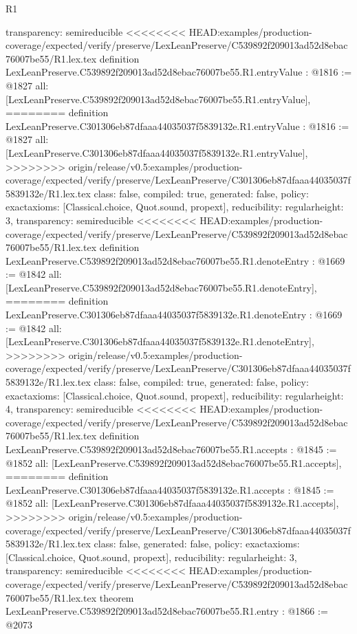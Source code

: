 \begin{lexlean}{R1}
\begin{coremodule}
{{{{{{{{{{{{{{{  transparency: semireducible
}
<<<<<<<< HEAD:examples/production-coverage/expected/verify/preserve/LexLeanPreserve/C539892f209013ad52d8ebac76007be55/R1.lex.tex
definition LexLeanPreserve.C539892f209013ad52d8ebac76007be55.R1.entryValue : @1816 := @1827 {
  all: [LexLeanPreserve.C539892f209013ad52d8ebac76007be55.R1.entryValue],
========
definition LexLeanPreserve.C301306eb87dfaaa44035037f5839132e.R1.entryValue : @1816 := @1827 {
  all: [LexLeanPreserve.C301306eb87dfaaa44035037f5839132e.R1.entryValue],
>>>>>>>> origin/release/v0.5:examples/production-coverage/expected/verify/preserve/LexLeanPreserve/C301306eb87dfaaa44035037f5839132e/R1.lex.tex
  class: false,
  compiled: true,
  generated: false,
  policy: exact{axioms: [Classical.choice, Quot.sound, propext]},
  reducibility: regular{height: 3},
  transparency: semireducible
}
<<<<<<<< HEAD:examples/production-coverage/expected/verify/preserve/LexLeanPreserve/C539892f209013ad52d8ebac76007be55/R1.lex.tex
definition LexLeanPreserve.C539892f209013ad52d8ebac76007be55.R1.denoteEntry : @1669 := @1842 {
  all: [LexLeanPreserve.C539892f209013ad52d8ebac76007be55.R1.denoteEntry],
========
definition LexLeanPreserve.C301306eb87dfaaa44035037f5839132e.R1.denoteEntry : @1669 := @1842 {
  all: [LexLeanPreserve.C301306eb87dfaaa44035037f5839132e.R1.denoteEntry],
>>>>>>>> origin/release/v0.5:examples/production-coverage/expected/verify/preserve/LexLeanPreserve/C301306eb87dfaaa44035037f5839132e/R1.lex.tex
  class: false,
  compiled: true,
  generated: false,
  policy: exact{axioms: [Classical.choice, Quot.sound, propext]},
  reducibility: regular{height: 4},
  transparency: semireducible
}
<<<<<<<< HEAD:examples/production-coverage/expected/verify/preserve/LexLeanPreserve/C539892f209013ad52d8ebac76007be55/R1.lex.tex
definition LexLeanPreserve.C539892f209013ad52d8ebac76007be55.R1.accepts : @1845 := @1852 {
  all: [LexLeanPreserve.C539892f209013ad52d8ebac76007be55.R1.accepts],
========
definition LexLeanPreserve.C301306eb87dfaaa44035037f5839132e.R1.accepts : @1845 := @1852 {
  all: [LexLeanPreserve.C301306eb87dfaaa44035037f5839132e.R1.accepts],
>>>>>>>> origin/release/v0.5:examples/production-coverage/expected/verify/preserve/LexLeanPreserve/C301306eb87dfaaa44035037f5839132e/R1.lex.tex
  class: false,
  generated: false,
  policy: exact{axioms: [Classical.choice, Quot.sound, propext]},
  reducibility: regular{height: 3},
  transparency: semireducible
}
<<<<<<<< HEAD:examples/production-coverage/expected/verify/preserve/LexLeanPreserve/C539892f209013ad52d8ebac76007be55/R1.lex.tex
theorem LexLeanPreserve.C539892f209013ad52d8ebac76007be55.R1.entry : @1866 := @2073 {
}}}}}}}}}}}}}}}}}}
\end{coremodule}
\end{lexlean}
